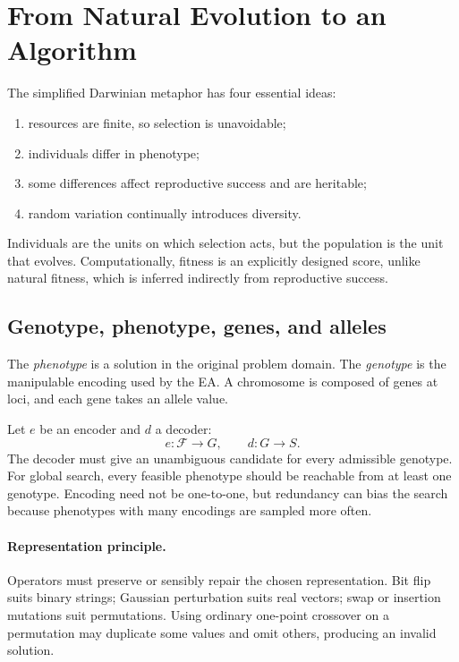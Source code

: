 \documentclass[11pt,a4paper]{article}
\begin{document}
\section{From Natural Evolution to an Algorithm}

The simplified Darwinian metaphor has four essential ideas:

\begin{enumerate}[leftmargin=*]
  \item resources are finite, so selection is unavoidable;
  \item individuals differ in phenotype;
  \item some differences affect reproductive success and are heritable;
  \item random variation continually introduces diversity.
\end{enumerate}

Individuals are the units on which selection acts, but the population is the
unit that evolves.  Computationally, fitness is an explicitly designed score,
unlike natural fitness, which is inferred indirectly from reproductive
success.

\subsection{Genotype, phenotype, genes, and alleles}

The \emph{phenotype} is a solution in the original problem domain.  The
\emph{genotype} is the manipulable encoding used by the EA.  A chromosome is
composed of genes at loci, and each gene takes an allele value.

Let $e$ be an encoder and $d$ a decoder:
\[
  e:\mathcal{F}\to G, \qquad d:G\to S.
\]
The decoder must give an unambiguous candidate for every admissible genotype.
For global search, every feasible phenotype should be reachable from at least
one genotype.  Encoding need not be one-to-one, but redundancy can bias the
search because phenotypes with many encodings are sampled more often.

\paragraph{Representation principle.}
Operators must preserve or sensibly repair the chosen representation.  Bit
flip suits binary strings; Gaussian perturbation suits real vectors; swap or
insertion mutations suit permutations.  Using ordinary one-point crossover
on a permutation may duplicate some values and omit others, producing an
invalid solution.
\end{document}
